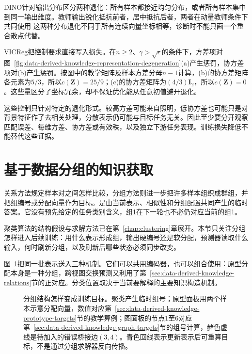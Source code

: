 DINO针对输出分布区分两种退化：所有样本都接近均匀分布，或者所有样本集中到同一输出维度。教师输出锐化抵抗前者，居中抵抗后者，两者在动量教师条件下共同使用
这两种分布退化不同于所有连续向量坐标相等，诊断时不能只画一个重合散点代替。

VICReg把控制要求直接写入损失。在$n\geq2$、$\gamma>\sqrt{\epsilon}$的条件下，方差项对图~\ref{fig:data-derived-knowledge-representation-degeneration}(a)产生惩罚，协方差项对(b)产生惩罚。按图中的教学矩阵及样本方差分母$n-1$计算，(b)的协方差矩阵各元素为$5/3$，所以$c(\bm{Z})=25/9$；(c)的协方差矩阵为$(4/3)\bm{I}_2$，所以$c(\bm{Z})=0$。这些量区分了坐标冗余，却不保证优化能从任意初值避开退化。

这些控制只针对特定的退化形式。较高方差可能来自照明，低协方差也可能只是对背景特征作了去相关处理，分散表示仍可能与目标任务无关。因此至少要分开观察匹配误差、每维方差、协方差或有效秩，以及独立下游任务表现。训练损失降低不能替代这些证据。

\section{基于数据分组的知识获取}
\label{sec:data-derived-knowledge-grouping}

关系方法规定样本对之间怎样比较，分组方法则进一步把许多样本组织成群组，并把组编号或分配向量作为目标。是由当前表示、相似性和分组配置共同产生的临时答案。它没有预先给定的任务类别含义，组1在下一轮也不必仍对应当前的组1。

聚类算法的结构假设与求解方法已在第~\ref{chap:clustering}章展开。本节只关注分组怎样进入后续训练：用什么表示形成组，输出硬编号还是软分配，预测器读取什么输入，何时刷新分组，以及刷新后哪些状态必须同步改变。

图~\ref{fig:data-derived-knowledge-grouping-targets}把同一批表示送入三种机制。它们可以共用编码器，也可以组合使用：原型分配本身是一种分组，跨视图交换预测又利用了第~\ref{sec:data-derived-knowledge-relations}节的正对应。分类位置取决于当前要解释的主要知识构造机制。

\begin{figure}[!t]
  \centering
  
  \caption{分组结构怎样变成训练目标。聚类产生临时组号；原型面板用两个样本示意分配向量，数值对应第~\ref{sec:data-derived-knowledge-prototype-targets}节的教学算例；图面板的节点1至6对应第~\ref{sec:data-derived-knowledge-graph-targets}节的组号计算，赭色虚线是待加入的错误桥接边$(3,4)$。青色回线表示更新表示后可重算目标，不是通过分组求解器反向传播。}
  \label{fig:data-derived-knowledge-grouping-targets}
\end{figure}

